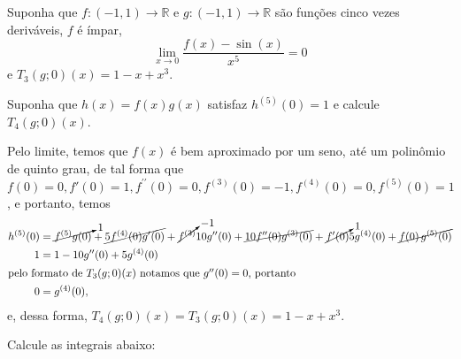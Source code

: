 \documentclass{IMTexam}
\begin{document}
\begin{questions}
\begin{solution}
            \hfill\qedsymbol
        \end{solution}
        \clearpage

        \question Suponha que $ f \colon (−1, 1) \longrightarrow \mathbb{R} $
        e $ g \colon (−1, 1) \longrightarrow \mathbb{R} $ são funções
        cinco vezes deriváveis, $ f $ é ímpar,
        \[ \lim\limits_{x\to0} \dfrac{f(x)−\sin(x)}{x^5} = 0 \]
        e $ T_3(g;0)(x) = 1 − x+x^3$.

        Suponha que $ h(x) = f (x)g(x) $ satisfaz $ h^{(5)}(0) = 1 $
        e calcule $ T_4(g; 0)(x) $.

        \begin{solution}
            Pelo limite, temos que $f(x)$ é bem aproximado por um seno, até um
            polinômio de quinto grau, de tal forma que $f(0)=0, f'(0)=1,
            f^{\prime\prime}(0)=0, f^{(3)}(0)=-1, f^{(4)}(0)=0, f^{(5)}(0)=1$, e
            portanto, temos
            \begin{align*}
            h^{(5)}(0)&= \cancelto{1}{f^{(5)}g(0)}+ \cancel{5f^{(4)}(0)g'(0)}+
            \cancelto{-1}{f^{(3)}}10g^{\prime\prime}(0)+
            \cancel{10f^{\prime\prime}(0)g^{(3)}(0)}+
            \cancelto{1}{f'(0)}5g^{(4)}(0)+ \cancel{f(0)\,g^{(5)}(0)}\\
            1&=1-10g^{\prime\prime}(0)+5g^{(4)}(0)\\
            \intertext{pelo formato de $T_3(g;0)(x)$ notamos que $g^{\prime\prime}(0)=0$, portanto}
            0&=g^{(4)}(0),
            \end{align*}
            e, dessa forma, $T_4(g; 0)(x)=T_3(g;0)(x) = 1 − x+x^3$.
        \end{solution}

        \question Calcule as integrais abaixo:


\end{questions}
\end{document}
